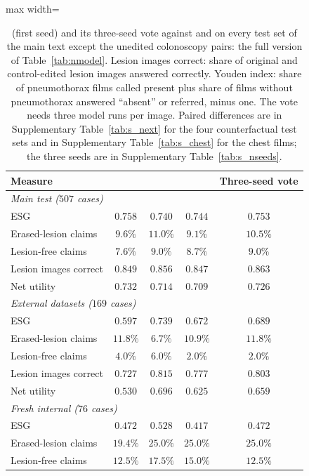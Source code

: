 \begin{table}[!htbp]
\caption{\msn{} (first seed) and its three-seed vote against \ms{} and \msp{} on every test set of the main text except the unedited colonoscopy pairs: the full version of Table~\ref{tab:nmodel}. Lesion images correct: share of original and control-edited lesion images answered correctly. Youden index: share of pneumothorax films called present plus share of films without pneumothorax answered ``absent'' or referred, minus one. The vote needs three model runs per image. Paired differences are in Supplementary Table~\ref{tab:s_next} for the four counterfactual test sets and in Supplementary Table~\ref{tab:s_chest} for the chest films; the three seeds are in Supplementary Table~\ref{tab:s_nseeds}.}
\label{tab:s_nmodel}
\centering
\footnotesize
\begin{adjustbox}{max width=\linewidth}
\begin{tabular}{l cccc}
\toprule
Measure & \ms{} & \msp{} & \msn{} & Three-seed vote \\
\midrule
\multicolumn{5}{l}{\emph{Main test ($507$ cases)}} \\
ESG & $0.758$ & $0.740$ & $0.744$ & $0.753$ \\
Erased-lesion claims & $9.6\%$ & $11.0\%$ & $9.1\%$ & $10.5\%$ \\
Lesion-free claims & $7.6\%$ & $9.0\%$ & $8.7\%$ & $9.0\%$ \\
Lesion images correct & $0.849$ & $0.856$ & $0.847$ & $0.863$ \\
Net utility & $0.732$ & $0.714$ & $0.709$ & $0.726$ \\
\midrule
\multicolumn{5}{l}{\emph{External datasets ($169$ cases)}} \\
ESG & $0.597$ & $0.739$ & $0.672$ & $0.689$ \\
Erased-lesion claims & $11.8\%$ & $6.7\%$ & $10.9\%$ & $11.8\%$ \\
Lesion-free claims & $4.0\%$ & $6.0\%$ & $2.0\%$ & $2.0\%$ \\
Lesion images correct & $0.727$ & $0.815$ & $0.777$ & $0.803$ \\
Net utility & $0.530$ & $0.696$ & $0.625$ & $0.659$ \\
\midrule
\multicolumn{5}{l}{\emph{Fresh internal ($76$ cases)}} \\
ESG & $0.472$ & $0.528$ & $0.417$ & $0.472$ \\
Erased-lesion claims & $19.4\%$ & $25.0\%$ & $25.0\%$ & $25.0\%$ \\
Lesion-free claims & $12.5\%$ & $17.5\%$ & $15.0\%$ & $12.5\%$ \\

\end{tabular}
\end{adjustbox}
\end{table}
